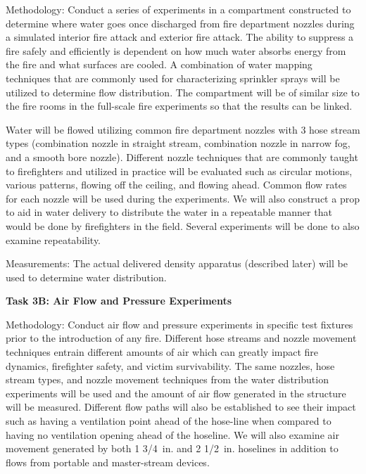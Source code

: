 \documentclass{article}
\begin{document}
\begin{itemize}
Methodology: Conduct a series of experiments in a compartment constructed to determine where water goes once discharged from fire department nozzles during a simulated interior fire attack and exterior fire attack. The ability to suppress a fire safely and efficiently is dependent on how much water absorbs energy from the fire and what surfaces are cooled. A combination of water mapping techniques that are commonly used for characterizing sprinkler sprays will be utilized to determine flow distribution. The compartment will be of similar size to the fire rooms in the full-scale fire experiments so that the results can be linked.

Water will be flowed utilizing common fire department nozzles with 3 hose stream types (combination nozzle in straight stream, combination nozzle in narrow fog, and a smooth bore nozzle). Different nozzle techniques that are commonly taught to firefighters and utilized in practice will be evaluated such as circular motions, various patterns, flowing off the ceiling, and flowing ahead. Common flow rates for each nozzle will be used during the experiments. We will also construct a prop to aid in water delivery to distribute the water in a repeatable manner that would be done by firefighters in the field. Several experiments will be done to also examine repeatability.  

Measurements: The actual delivered density apparatus (described later) will be used to determine water distribution. 
\vspace*{\baselineskip}

\clearpage

\subitem \bf{Task 3B:  Air Flow and Pressure Experiments}
\normalfont
\vspace*{\baselineskip}

Methodology: Conduct air flow and pressure experiments in specific test fixtures prior to the introduction of any fire. Different hose streams and nozzle movement techniques entrain different amounts of air which can greatly impact fire dynamics, firefighter safety, and victim survivability. The same nozzles, hose stream types, and nozzle movement techniques from the water distribution experiments will be used and the amount of air flow generated in the structure will be measured. Different flow paths will also be established to see their impact such as having a ventilation point ahead of the hose-line when compared to having no ventilation opening ahead of the hoseline. We will also examine air movement generated by both 1 3/4~in. and 2 1/2~in. hoselines in addition to flows from portable and master-stream devices.


\end{itemize}
\end{document}

